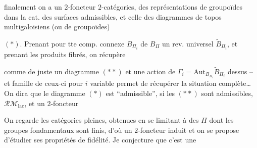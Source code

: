  finalement on a un $2$-foncteur   $2$-catégories,  des représentations de groupoïdes dans la cat. des surfaces admissibles, et celle des diagrammes de topos multigaloisiens (ou de groupoïdes)

$(*)$. Prenant pour tte comp. connexe $B_{\Pi_i}$ de $B_\Pi$ un rev. universel $\widetilde B_{\Pi_i}$, et prenant les produits fibrés, on récupère

comme de juste un diagramme
$(**)$
et une action de $\Gamma_i=\mathrm{Aut}_{B_{\Pi_i}}\widetilde B_{\Pi_i}$ dessus -- et   famille de ceux-ci pour $i$ variable permet de récupérer la situation complète\ldots On dira que le diagramme $(*)$ est ``admissible'', si les  $(**)$ sont admissibles,     $\mathcal{RM}_{\mathrm{lac}}$, et un $2$-foncteur

On regarde les  catégories pleines, obtenues en se limitant à des $\Pi$ dont les groupes fondamentaux sont finis, d'où un $2$-foncteur induit
et on se propose d'étudier ses propriétés de fidélité. Je conjecture que c'est une

